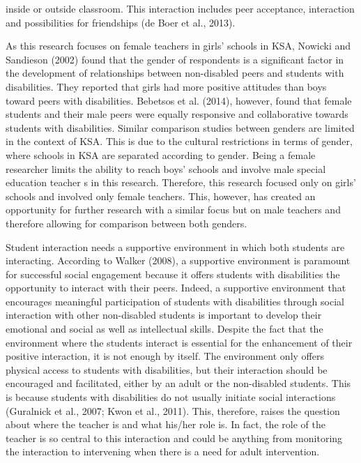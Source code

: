 \documentclass[11.5pt]{sig-alternate}
\begin{document}
\begin{large}
inside or outside classroom. This interaction includes peer acceptance, interaction and possibilities for friendships (de Boer et al., 2013).  

As this research focuses on female teachers in girls’ schools in KSA, Nowicki and Sandieson (2002) found that the gender of respondents is a significant factor in the development of relationships between non-disabled peers and students with disabilities. They reported that girls had more positive attitudes than boys toward peers with disabilities. Bebetsos et al. (2014), however, found that female students and their male peers were equally responsive and collaborative towards students with disabilities. Similar comparison studies between genders are limited in the context of KSA. This is due to the cultural restrictions in terms of gender, where schools in KSA are separated according to gender. Being a female researcher limits the ability to reach boys’ schools and involve male special education teacher s in this research. Therefore, this research focused only on girls’ schools and involved only female teachers. This, however, has created an opportunity for further research with a similar focus but on male teachers and therefore allowing for comparison between both genders.  

Student interaction needs a supportive environment in which both students are interacting. According to Walker (2008), a supportive environment is paramount for successful social engagement because it offers students with disabilities the opportunity to interact with their peers. Indeed, a supportive environment that encourages meaningful participation of students with disabilities through social interaction with other non-disabled students is important to develop their emotional and social as well as intellectual skills. Despite the fact that the environment where the students interact is essential for the enhancement of their positive interaction, it is not enough by itself. The environment only offers physical access to students with disabilities, but their interaction should be encouraged and facilitated, either by an adult or the non-disabled students. This is because students with disabilities do not usually initiate social interactions (Guralnick et al., 2007; Kwon et al., 2011). This, therefore, raises the question about where the teacher is and what his/her role is. In fact, the role of the teacher is so central to this interaction and could be anything from monitoring the interaction to intervening when there is a need for adult intervention.


\end{large}
\end{document}
